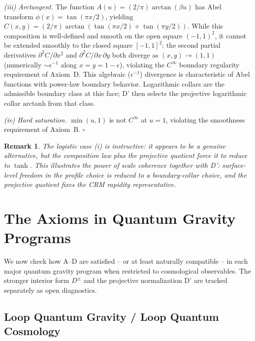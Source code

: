 \documentclass[aps,prd,twocolumn,superscriptaddress,nofootinbib]{revtex4-2}
\newtheorem{remark}{Remark}
\begin{document}
\textit{(iii) Arctangent.} The function $A(u) = (2/\pi)\arctan(\beta u)$ has Abel transform $\phi(x) = \tan(\pi x/2)$, yielding $C(x,y) = (2/\pi)\arctan(\tan(\pi x/2) + \tan(\pi y/2))$. While this composition is well-defined and smooth on the open square $(-1,1)^2$, it cannot be extended smoothly to the closed square $[-1,1]^2$: the second partial derivatives $\partial^2 C/\partial x^2$ and $\partial^2 C/\partial x\,\partial y$ both diverge as $(x,y) \to (1,1)$ (numerically $\sim \epsilon^{-1}$ along $x = y = 1 - \epsilon$), violating the $C^\infty$ boundary regularity requirement of Axiom~D. This algebraic ($\epsilon^{-1}$) divergence is characteristic of Abel functions with power-law boundary behavior. Logarithmic collars are the admissible boundary class at this face; D' then selects the projective logarithmic collar $\mathrm{arctanh}$ from that class.

\textit{(iv) Hard saturation.} $\min(u, 1)$ is not $C^\infty$ at $u = 1$, violating the smoothness requirement of Axiom~B. \hfill $\square$

\begin{remark}
The logistic case (i) is instructive: it appears to be a genuine alternative, but the composition law plus the projective quotient force it to reduce to $\tanh$. This illustrates the power of scale coherence together with D': surface-level freedom in the profile choice is reduced to a boundary-collar choice, and the projective quotient fixes the CRM rapidity representative.
\end{remark}


\section{The Axioms in Quantum Gravity Programs}
\label{sec:qg}

We now check how A--D are satisfied -- or at least naturally compatible -- in each major quantum gravity program when restricted to cosmological observables. The stronger interior form $D^\pm$ and the projective normalization D' are tracked separately as open diagnostics.

\subsection{Loop Quantum Gravity / Loop Quantum Cosmology}
\end{document}
